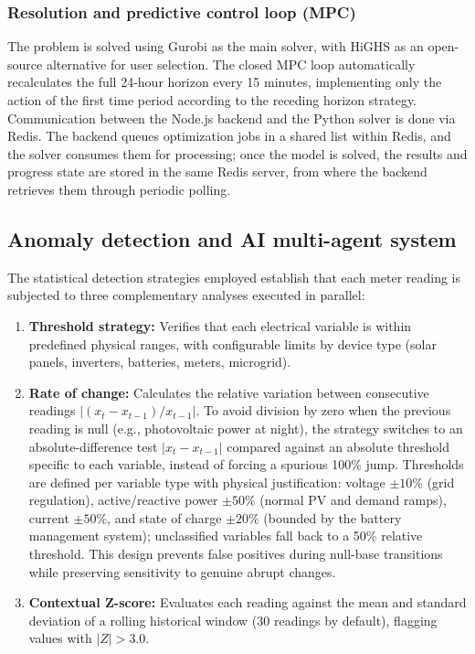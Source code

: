 \documentclass[journal,article,submit,pdftex,moreauthors]{Definitions/mdpi}
\begin{document}
\subsubsection{Resolution and predictive control loop (MPC)}
The problem is solved using Gurobi as the main solver, with HiGHS as an open-source alternative for user selection. The closed MPC loop automatically recalculates the full 24-hour horizon every 15 minutes, implementing only the action of the first time period according to the receding horizon strategy. Communication between the Node.js backend and the Python solver is done via Redis. The backend queues optimization jobs in a shared list within Redis, and the solver consumes them for processing; once the model is solved, the results and progress state are stored in the same Redis server, from where the backend retrieves them through periodic polling.

\subsection{Anomaly detection and AI multi-agent system}
The statistical detection strategies employed establish that each meter reading is subjected to three complementary analyses executed in parallel:
\begin{enumerate}
    \item \textbf{Threshold strategy:} Verifies that each electrical variable is within predefined physical ranges, with configurable limits by device type (solar panels, inverters, batteries, meters, microgrid).
    \item \textbf{Rate of change:} Calculates the relative variation between consecutive readings $|(x_t - x_{t-1}) / x_{t-1}|$. To avoid division by zero when the previous reading is null (e.g., photovoltaic power at night), the strategy switches to an absolute-difference test $|x_t - x_{t-1}|$ compared against an absolute threshold specific to each variable, instead of forcing a spurious 100\% jump. Thresholds are defined per variable type with physical justification: voltage $\pm 10\%$ (grid regulation), active/reactive power $\pm 50\%$ (normal PV and demand ramps), current $\pm 50\%$, and state of charge $\pm 20\%$ (bounded by the battery management system); unclassified variables fall back to a 50\% relative threshold. This design prevents false positives during null-base transitions while preserving sensitivity to genuine abrupt changes.
    \item \textbf{Contextual Z-score:} Evaluates each reading against the mean and standard deviation of a rolling historical window (30 readings by default), flagging values with $|Z| > 3.0$.
\end{enumerate}
\end{document}
